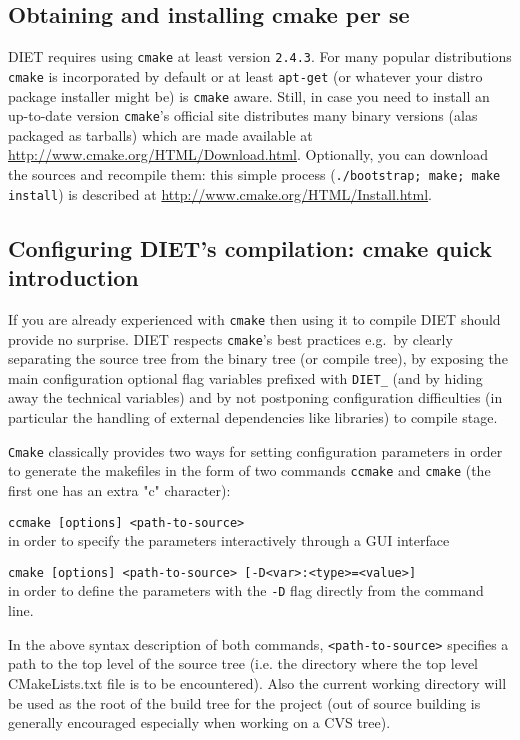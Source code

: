 \subsection{Obtaining and installing cmake per se}
DIET requires using \verb+cmake+ at least version \verb+2.4.3+.
For many popular distributions \verb+cmake+ is incorporated by
default or at least \verb+apt-get+ (or whatever your distro package installer
might be) is \verb+cmake+ aware.
Still, in case you need to install an up-to-date version \verb+cmake+'s
official site distributes many binary versions (alas packaged as tarballs)
which are made available at 
\url{http://www.cmake.org/HTML/Download.html}.
Optionally, you can download the sources and recompile them: this simple
process (\verb+./bootstrap; make; make install+) is described at
\url{http://www.cmake.org/HTML/Install.html}.

\subsection{Configuring DIET's compilation: cmake quick introduction}
If you are already experienced with \verb+cmake+ then using it to compile
DIET should provide no surprise. 
DIET respects \verb+cmake+'s best practices e.g.~by clearly separating the
source tree from the binary tree (or compile tree), by exposing the main
configuration optional flag variables prefixed with \verb+DIET_+ (and by
hiding away the technical variables) and by not postponing configuration
difficulties (in particular the handling of external dependencies like
libraries) to compile stage.

\verb+Cmake+ classically provides two ways for setting configuration
parameters in order to generate the makefiles in the form of two
commands \verb+ccmake+ and \verb+cmake+ (the first one has an extra "c"
character):
\begin{description}
\item{\verb+ccmake [options] <path-to-source>+}\\
  in order to specify the parameters interactively through a GUI interface
\item{\verb+cmake [options] <path-to-source> [-D<var>:<type>=<value>]+}\\
  in order to define the parameters with the \verb+-D+ flag directly
  from the command line.
\end{description}
In the above syntax description of both commands, {\verb+<path-to-source>+}
specifies a path to the top level of the source tree (i.e. the directory
where the top level CMakeLists.txt file is to be encountered). Also
the current working directory will be used as the root of the build tree for
the project (out of source building is generally encouraged especially
when working on a CVS tree).

